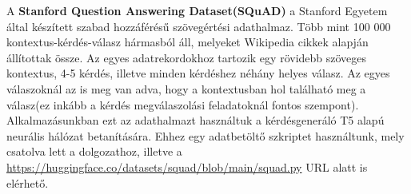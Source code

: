 
A \textbf{Stanford Question Answering Dataset(SQuAD)\cite{squad}} a Stanford Egyetem által készített szabad hozzáférésű szövegértési adathalmaz. Több mint 100 000 kontextus-kérdés-válasz hármasból áll, melyeket Wikipedia cikkek alapján állítottak össze. Az egyes adatrekordokhoz tartozik egy rövidebb szöveges kontextus, 4-5 kérdés, illetve minden kérdéshez néhány helyes válasz. Az egyes válaszoknál az is meg van adva, hogy a kontextusban hol található meg a válasz(ez inkább a kérdés megválaszolási feladatoknál fontos szempont). Alkalmazásunkban ezt az adathalmazt használtuk a kérdésgeneráló T5 alapú neurális hálózat betanítására. Ehhez egy adatbetöltő szkriptet használtunk, mely csatolva lett a dolgozathoz, illetve a \url{https://huggingface.co/datasets/squad/blob/main/squad.py} URL alatt is elérhető.



